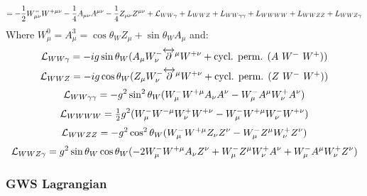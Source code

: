 \begin{equation*}
  = -{1\over2}W^-_{\mu\nu}W^{+\mu\nu} -{1\over4}A_{\mu\nu}A^{\mu\nu} -{1\over4}Z_{\mu\nu}Z^{\mu\nu} +{\mathcal L}_{WW\gamma}+L_{WWZ}+L_{WW\gamma\gamma}+L_{WWWW}+L_{WWZZ}+L_{WWZ\gamma}
\end{equation*}
Where $W^0_\mu = A^3_\mu=\cos\theta_W Z_\mu + \sin\theta_W A_\mu$ and: 
\begin{equation*}
  {\mathcal L}_{WW\gamma}=-ig\sin\theta_W(A_\mu W^-_\nu\overleftrightarrow\partial^\mu W^{+\nu} + \hbox{cycl. perm. ($A$ $W^-$ $W^+$)})
\end{equation*}
\begin{equation*}
  {\mathcal L}_{WWZ}=-ig\cos\theta_W(Z_\mu W^-_\nu\overleftrightarrow\partial^\mu W^{+\nu}+\hbox{cycl. perm. ($Z$ $W^-$ $W^+$)})
\end{equation*}
\begin{equation*}
  {\mathcal L}_{WW\gamma\gamma}=-g^2\sin^2\theta_W(W^-_\mu W^{+\mu}A_\nu A^\nu- W^-_\mu A^\mu W^+_\nu A^\nu)
\end{equation*}
\begin{equation*}
  {\mathcal L}_{WWWW}={\textstyle{1\over2}} g^2(W^-_\mu W^{-\mu}W^+_\nu W^{+\nu} -W^-_\mu W^{+\mu}W^-_\nu W^{+\nu} )
\end{equation*}
\begin{equation*}
  {\mathcal L}_{WWZZ}=-g^2\cos^2\theta_W(W^-_\mu W^{+\mu}Z_\nu Z^\nu -W^-_\mu Z^\mu W^+_\nu Z^\nu )
\end{equation*}
\begin{equation*}
  {\mathcal L}_{WWZ\gamma}=g^2\sin\theta_W\cos\theta_W(-2W^-_\mu W^{+\mu}A_\nu Z^\nu+W^-_\mu Z^\mu W^+_\nu A^\nu+W^-_\mu A^\mu W^+_\nu Z^\nu)
\end{equation*}
\subsubsection{GWS Lagrangian}


